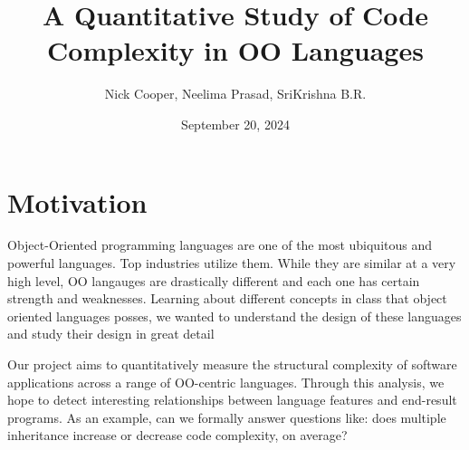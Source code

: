 \documentclass{article}
\title{A Quantitative Study of Code Complexity in OO Languages}
\author{Nick Cooper, Neelima Prasad, SriKrishna B.R.}
\date{September 20, 2024}
\begin{document}
\maketitle

\section{Motivation}
Object-Oriented programming languages are one of the most ubiquitous and powerful languages. Top industries utilize them. While they are similar at a very high level, OO langauges are drastically different and each one has certain strength and weaknesses. Learning about different concepts in class that object oriented languages posses, we wanted to understand the design of these languages and study their design in great detail 

Our project aims to quantitatively measure the structural complexity of software applications across a range of OO-centric languages. Through this analysis, we hope to detect interesting relationships between language features and end-result programs. As an example, can we formally answer questions like: does multiple inheritance increase or decrease code complexity, on average? 
\end{document}
